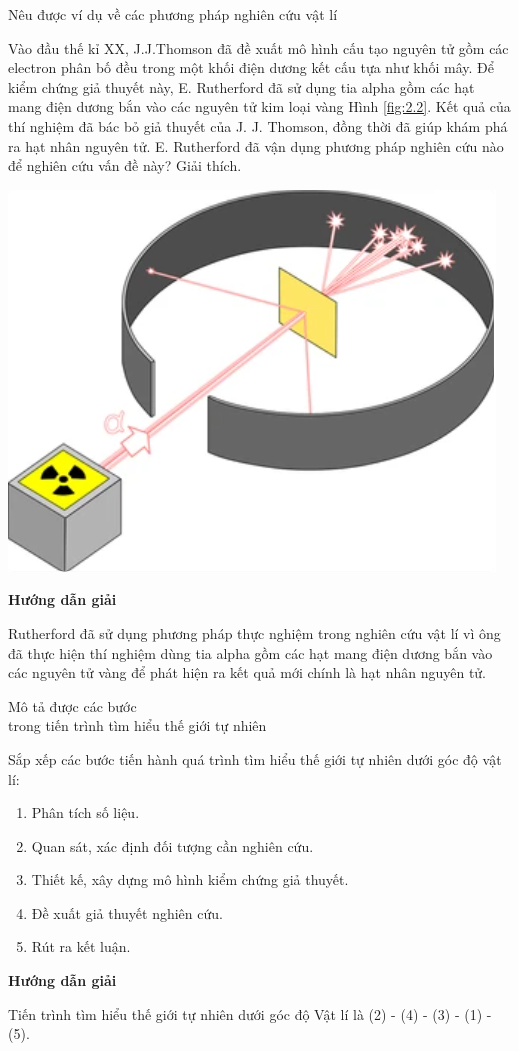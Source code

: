 \begin{dang}{Nêu được ví dụ về các phương pháp nghiên cứu vật lí}
	{Vào đầu thế kỉ XX, J.J.Thomson đã đề xuất mô hình cấu tạo nguyên tử gồm các electron phân bố đều trong một khối điện dương kết cấu tựa như khối mây. Để kiểm chứng giả thuyết này, E. Rutherford đã sử dụng tia alpha gồm các hạt mang điện dương bắn vào các nguyên tử kim loại vàng Hình \ref{fig:2.2}. Kết quả của thí nghiệm đã bác bỏ giả thuyết của J. J. Thomson, đồng thời đã giúp khám phá ra hạt nhân nguyên tử. E. Rutherford đã vận dụng phương pháp nghiên cứu nào để nghiên cứu vấn đề này? Giải thích.
	\begin{center}
		\includegraphics[width=0.3\linewidth]{../figs/VN10-2023-PH-TP002-2}
		\label{fig:2.2}
\end{center}  }
	{\begin{center}
			\textbf{Hướng dẫn giải}
		\end{center}
		Rutherford đã sử dụng phương pháp thực nghiệm trong nghiên cứu vật lí vì ông đã thực hiện thí nghiệm dùng tia alpha gồm các hạt mang điện dương bắn vào các nguyên tử vàng để phát hiện ra kết quả mới chính là hạt nhân nguyên tử.
	}
\end{dang}
\begin{dang}{Mô tả được các bước \\trong tiến trình tìm hiểu thế giới tự nhiên}
	{Sắp xếp các bước tiến hành quá trình tìm hiểu thế giới tự nhiên dưới góc độ vật lí:\\
	\begin{enumerate}[label= (\arabic*)]
		\item Phân tích số liệu.
		\item Quan sát, xác định đối tượng cần nghiên cứu.
		\item Thiết kế, xây dựng mô hình kiểm chứng giả thuyết.
		\item Đề xuất giả thuyết nghiên cứu.
		\item Rút ra kết luận.
\end{enumerate} }
	{\begin{center}
			\textbf{Hướng dẫn giải}
		\end{center}
	Tiến trình tìm hiểu thế giới tự nhiên dưới góc độ Vật lí là (2) - (4) - (3) - (1) - (5).
	}
\end{dang}


